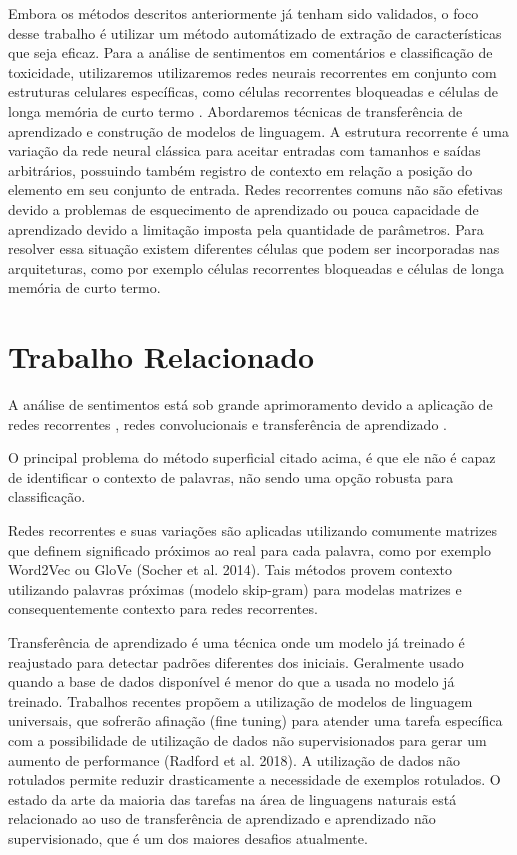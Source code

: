 \documentclass[12pt]{article}
\begin{document}
Embora os métodos descritos anteriormente já tenham sido validados, o foco desse trabalho é utilizar um método automátizado de extração de características que seja eficaz. Para a análise de sentimentos em comentários e classificação de toxicidade, utilizaremos utilizaremos redes neurais recorrentes em conjunto com estruturas celulares específicas, como células recorrentes bloqueadas \cite{DBLP:journals/corr/PascanuGCB13} e células de longa memória de curto termo \cite{sep:97}. Abordaremos técnicas de transferência de aprendizado e construção de modelos de linguagem.
A estrutura recorrente é uma variação da rede neural clássica para aceitar entradas com tamanhos e saídas arbitrários, possuindo também registro de contexto em relação a posição do elemento em seu conjunto de entrada. Redes recorrentes comuns não são efetivas devido a problemas de esquecimento de aprendizado ou pouca capacidade de aprendizado devido a limitação imposta pela quantidade de parâmetros. Para resolver essa situação existem diferentes células que podem ser incorporadas nas arquiteturas, como por exemplo células recorrentes bloqueadas e células de longa memória de curto termo.


\section{Trabalho Relacionado} \label{sec:relacionado}

A análise de sentimentos está sob grande aprimoramento devido a aplicação de redes recorrentes \cite{karpathy:2015}, redes convolucionais \cite{lecun:98} e transferência de aprendizado \cite{DBLP:journals/corr/abs-1801-06146}.

O principal problema do método superficial citado acima, é que ele não é capaz de identificar o contexto de palavras, não sendo uma opção robusta para classificação.

Redes recorrentes e suas variações são aplicadas utilizando comumente matrizes que definem significado próximos ao real para cada palavra, como por exemplo Word2Vec \cite{DBLP:journals/corr/abs-1301-3781} ou GloVe (Socher et al. 2014). Tais métodos provem contexto utilizando palavras próximas (modelo skip-gram) para modelas matrizes e consequentemente contexto para redes recorrentes.

Transferência de aprendizado é uma técnica onde um modelo já treinado é reajustado para detectar padrões diferentes dos iniciais. Geralmente usado quando a base de dados disponível é menor do que a usada no modelo já treinado. Trabalhos recentes propõem a utilização de modelos de linguagem universais, que sofrerão afinação (fine tuning) para atender uma tarefa específica \cite{DBLP:journals/corr/abs-1801-06146} com a possibilidade de utilização de dados não supervisionados para gerar um aumento de performance (Radford et al. 2018). A utilização de dados não rotulados permite reduzir drasticamente a necessidade de exemplos rotulados. O estado da arte da maioria das tarefas na área de linguagens naturais está relacionado ao uso de transferência de aprendizado e aprendizado não supervisionado, que é um dos maiores desafios atualmente.
\end{document}
